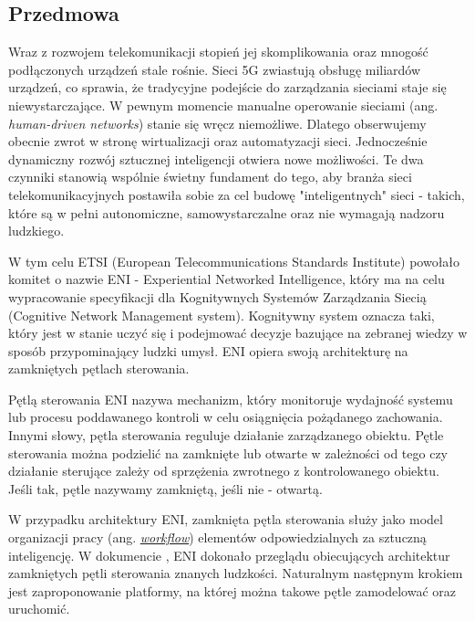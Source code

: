 \subsection{Przedmowa}

Wraz z rozwojem telekomunikacji stopień jej skomplikowania oraz mnogość podłączonych urządzeń stale rośnie. Sieci 5G zwiastują obsługę miliardów urządzeń, co sprawia, że tradycyjne podejście do zarządzania sieciami staje się niewystarczające. W pewnym momencie manualne operowanie sieciami (ang. \textit{human-driven networks}) stanie się wręcz niemożliwe. Dlatego obserwujemy obecnie zwrot w stronę wirtualizacji oraz automatyzacji sieci. Jednocześnie dynamiczny rozwój sztucznej inteligencji otwiera nowe możliwości. Te dwa czynniki stanowią wspólnie świetny fundament do tego, aby branża sieci telekomunikacyjnych postawiła sobie za cel budowę "inteligentnych" sieci - takich, które są w pełni autonomiczne, samowystarczalne oraz nie wymagają nadzoru ludzkiego.

W tym celu ETSI (European Telecommunications Standards Institute) powołało komitet o nazwie ENI - Experiential Networked Intelligence, który ma na celu wypracowanie specyfikacji dla Kognitywnych Systemów Zarządzania Siecią (Cognitive Network Management system). Kognitywny system oznacza taki, który jest w stanie uczyć się i podejmować decyzje bazujące na zebranej wiedzy w sposób przypominający ludzki umysł. ENI opiera swoją architekturę na zamkniętych pętlach sterowania.

Pętlą sterowania ENI nazywa mechanizm, który monitoruje wydajność systemu lub procesu poddawanego kontroli w celu osiągnięcia pożądanego zachowania. Innymi słowy, pętla sterowania reguluje działanie zarządzanego obiektu. Pętle sterowania można podzielić na zamknięte lub otwarte w zależności od tego czy działanie sterujące zależy od sprzężenia zwrotnego z kontrolowanego obiektu. Jeśli tak, pętle nazywamy zamkniętą, jeśli nie - otwartą. 

W przypadku architektury ENI, zamknięta pętla sterowania służy jako model organizacji pracy (ang. \hyperlink{def:workflow}{\textit{workflow}}) elementów odpowiedzialnych za sztuczną inteligencję. W dokumencie \cite*{enioverview}, ENI dokonało przeglądu obiecujących architektur zamkniętych pętli sterowania znanych ludzkości. Naturalnym następnym krokiem jest zaproponowanie platformy, na której można takowe pętle zamodelować oraz uruchomić. 

